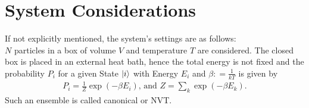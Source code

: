 \section{System Considerations}
If not explicitly mentioned, the system's settings are as follows:\medskip\\
$N$ particles in a box of volume $V$ and temperature $T$ are considered.
The closed box is placed in an external heat bath, hence the total energy is not fixed and the probability $P_i$ for a given State $\ket{i}$ with Energy $E_i$ and $\beta \mathrel{\mathop:}= \frac{1}{kT}$ is given by
\begin{align}
	P_i = \frac{1}{Z}\exp\left(-\beta E_i\right)\text{, and }
	Z = \sum_k \exp\left(-\beta E_k\right).
\end{align}
Such an ensemble is called canonical or NVT.
